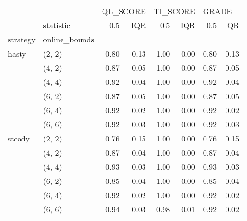 \begin{tabular}{llrrrrrr}
\toprule
       & {} & \multicolumn{2}{l}{QL\_SCORE} & \multicolumn{2}{l}{TI\_SCORE} & \multicolumn{2}{l}{GRADE} \\
       & statistic &      0.5 &  IQR &      0.5 &  IQR &   0.5 &  IQR \\
strategy & online\_bounds &          &      &          &      &       &      \\
\midrule
hasty & (2, 2) &     0.80 & 0.13 &     1.00 & 0.00 &  0.80 & 0.13 \\
       & (4, 2) &     0.87 & 0.05 &     1.00 & 0.00 &  0.87 & 0.05 \\
       & (4, 4) &     0.92 & 0.04 &     1.00 & 0.00 &  0.92 & 0.04 \\
       & (6, 2) &     0.87 & 0.05 &     1.00 & 0.00 &  0.87 & 0.05 \\
       & (6, 4) &     0.92 & 0.02 &     1.00 & 0.00 &  0.92 & 0.02 \\
       & (6, 6) &     0.92 & 0.03 &     1.00 & 0.00 &  0.92 & 0.03 \\
steady & (2, 2) &     0.76 & 0.15 &     1.00 & 0.00 &  0.76 & 0.15 \\
       & (4, 2) &     0.87 & 0.04 &     1.00 & 0.00 &  0.87 & 0.04 \\
       & (4, 4) &     0.93 & 0.03 &     1.00 & 0.00 &  0.93 & 0.03 \\
       & (6, 2) &     0.85 & 0.04 &     1.00 & 0.00 &  0.85 & 0.04 \\
       & (6, 4) &     0.92 & 0.02 &     1.00 & 0.00 &  0.92 & 0.02 \\
       & (6, 6) &     0.94 & 0.03 &     0.98 & 0.01 &  0.92 & 0.02 \\
\bottomrule
\end{tabular}
